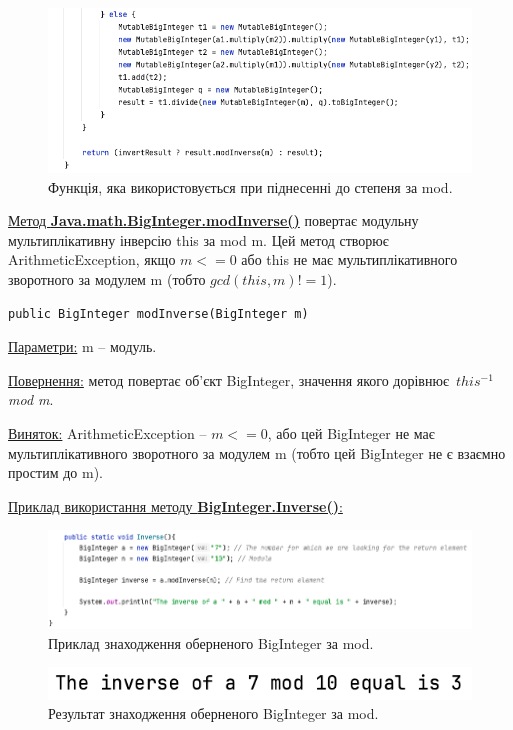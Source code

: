 \vspace{-1cm}
\begin{figure}[h]
     \centering
     \includegraphics[scale = 0.5]{../IMAGES/Java/BigInt_modPow3.png}
     \caption{\large{Функція, яка використовується при піднесенні до степеня за mod.}}
     \label{fig_java_mPow5}
\end{figure}

\newpage
\uline{Метод \textbf{Java.math.BigInteger.modInverse()}} повертає модульну мультиплікативну інверсію this за mod m. Цей метод створює ArithmeticException, якщо $m <= 0$ або this не має мультиплікативного зворотного за модулем m (тобто $gcd(this, m) != 1$). 

\texttt{public BigInteger modInverse(BigInteger m)}

\uline{Параметри:} m -- модуль. 

\uline{Повернення:} метод повертає об’єкт BigInteger, значення якого дорівнює~$this^{-1}$ \textit{mod m}. 

\uline{Виняток:} ArithmeticException -- $m <= 0$, або цей BigInteger не має мультиплікативного зворотного за модулем m (тобто цей BigInteger не є взаємно простим до m).

\newpage
\uline{Приклад використання методу \textbf{BigInteger.Inverse()}:}

\begin{figure}[h]
     \centering
     \includegraphics[scale = 0.49]{../IMAGES/Java/BigInt_Inv_ex.png}
     \caption{Приклад знаходження оберненого BigInteger за mod.}
     \label{fig_java_Inv1}
\end{figure}
\vspace{-1cm}
\begin{figure}[h]
     \centering
     \includegraphics[scale = 0.5]{../IMAGES/Java/BigInt_Inv_output.png}
     \caption{Результат знаходження оберненого BigInteger за mod.}
     \label{fig_java_Inv2}
\end{figure}

